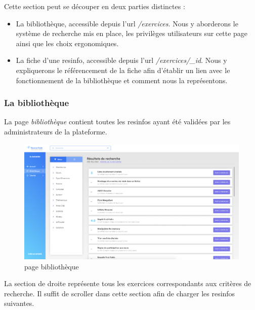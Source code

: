 Cette section peut se découper en deux parties distinctes :

\begin{itemize}
    \item La bibliothèque, accessible depuis l'url \textit{/exercices}. Nous y aborderons le système de recherche mis en place, les privilèges utilisateurs sur cette page ainsi que les choix ergonomiques.\\
    \item La \gls{fiche} d'une \gls{resinfo}, accessible depuis l'url \textit{/exercices/\_id}. Nous y expliquerons le référencement de la \gls{fiche} afin d'établir un lien avec le fonctionnement de la bibliothèque et comment nous la représentons.
\end{itemize}

\subsubsection{La bibliothèque}

La page \textit{bibliothèque} contient toutes les \glspl{resinfo} ayant été validées par les administrateurs de la plateforme.\\

\begin{figure}[H]
    \includegraphics[width=\textwidth,height=\textheight,keepaspectratio]{images/client/library.png}
    \centering
    \caption[SourceCode : page bibliothèque]{page bibliothèque}
\end{figure}



La section de droite représente tous les exercices correspondants aux critères de recherche. Il suffit de scroller dans cette section afin de charger les \glspl{resinfo} suivantes.\\

